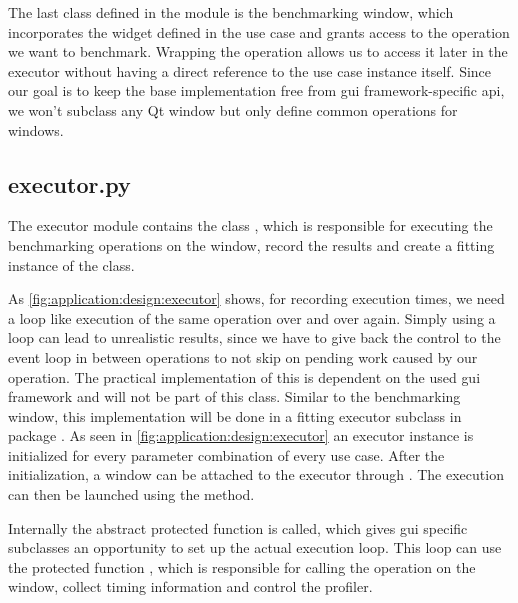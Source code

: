 

The last class defined in the module is the benchmarking window, which
incorporates the widget defined in the use case and grants access to the
operation we want to benchmark. Wrapping the operation allows us to access it
later in the executor without having a direct reference to the use case
instance itself. Since our goal is to keep the base implementation free from
\gls{gui} framework-specific \gls{api}, we won't subclass any Qt window but
only define common operations for windows.

\subsection{executor.py}

The executor module contains the class
, which is responsible for executing
the benchmarking operations on the window, record the results and create a
fitting instance of the  class.

As \ref{fig:application:design:executor} shows, for recording execution times,
we need a loop like execution of the same operation over and over again. Simply
using a loop can lead to unrealistic results, since we have to give back the
control to the event loop in between operations to not skip on pending work
caused by our operation. The practical implementation of this is dependent on
the used \gls{gui} framework and will not be part of this class. Similar to the
benchmarking window, this implementation will be done in a fitting executor
subclass in package . As seen in
\ref{fig:application:design:executor} an executor instance is initialized for
every parameter combination of every use case. After the initialization, a
window can be attached to the executor through
. The execution can then be launched using the
 method. 



Internally the abstract protected function  is
called, which gives \gls{gui} specific subclasses an opportunity to set up the
actual execution loop. This loop can use the protected function
, which is responsible for calling the
operation on the window, collect timing information and control the profiler.

